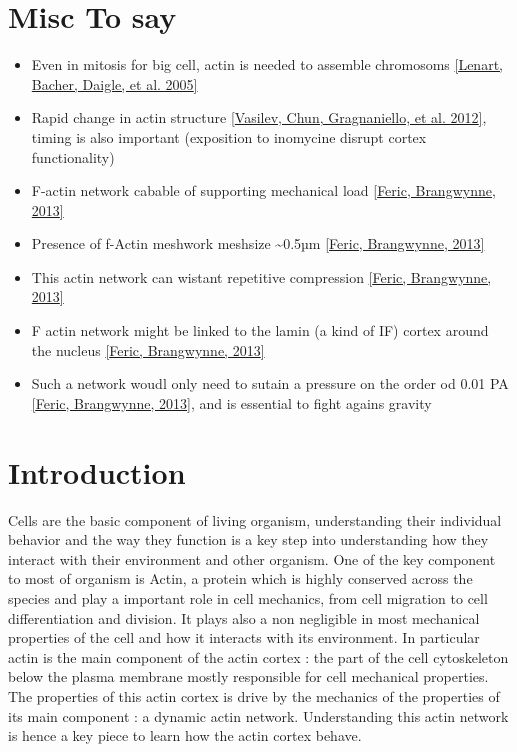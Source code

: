 \documentclass[A4paperpaper,11pt,english]{sphinxmanual}
\begin{document}
\section{Misc To say}
\label{parts/part1:misc-to-say}\begin{itemize}
\item {} 
Even in mitosis for big cell, actin is needed to assemble chromosoms {\hyperref[bibitem:lenart2005]{{[}Lenart, Bacher, Daigle,  et al.  2005{]}}}

\item {} 
Rapid change in actin structure {\hyperref[bibitem:vasilev2012]{{[}Vasilev, Chun, Gragnaniello,  et al.  2012{]}}}, timing is also important (exposition to inomycine disrupt cortex functionality)

\item {} 
F-actin network cabable of supporting mechanical load {\hyperref[bibitem:feric2013]{{[}Feric, Brangwynne,  2013{]}}}

\item {} 
Presence of f-Actin meshwork meshsize \textasciitilde{}0.5µm {\hyperref[bibitem:feric2013]{{[}Feric, Brangwynne,  2013{]}}}

\item {} 
This actin network can wistant repetitive compression {\hyperref[bibitem:feric2013]{{[}Feric, Brangwynne,  2013{]}}}

\item {} 
F actin network might be linked to the lamin (a kind of IF) cortex around the nucleus {\hyperref[bibitem:feric2013]{{[}Feric, Brangwynne,  2013{]}}}

\item {} 
Such a network woudl only need to sutain a pressure on the order od 0.01 PA {\hyperref[bibitem:feric2013]{{[}Feric, Brangwynne,  2013{]}}},
and is essential to fight agains gravity

\end{itemize}


\section{Introduction}
\label{parts/part1:introduction}
Cells are the basic component of living organism, understanding their
individual behavior and the way they function is a key step into understanding
how they interact with their environment and other organism. One of the key
component to most of organism is Actin, a protein which is highly conserved
across the species and play a important role in cell mechanics, from cell
migration to cell differentiation and division. It plays also a non negligible
in most mechanical properties of the cell and how it interacts with its
environment. In particular actin is the main component of the actin cortex :
the part of the cell cytoskeleton below the plasma membrane mostly responsible
for cell mechanical properties. The properties of this actin cortex is drive by
the mechanics of the properties of its main component : a dynamic actin
network. Understanding this actin network is hence a key piece to learn how
the actin cortex behave.
\end{document}
